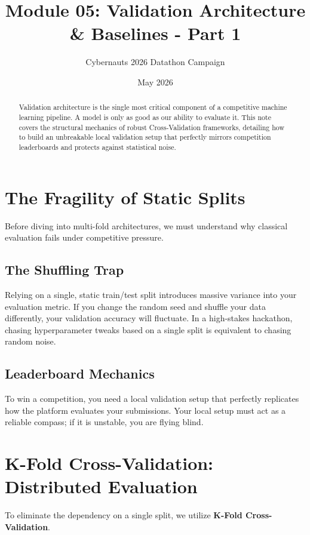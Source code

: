 \documentclass{article}
\title{Module 05: Validation Architecture \& Baselines - Part 1}
\author{Cybernauts 2026 Datathon Campaign}
\date{May 2026}
\begin{document}
\maketitle

\begin{abstract}
Validation architecture is the single most critical component of a competitive machine learning pipeline. A model is only as good as our ability to evaluate it. This note covers the structural mechanics of robust Cross-Validation frameworks, detailing how to build an unbreakable local validation setup that perfectly mirrors competition leaderboards and protects against statistical noise.
\end{abstract}

\tableofcontents
\newpage

\section{The Fragility of Static Splits}
Before diving into multi-fold architectures, we must understand why classical evaluation fails under competitive pressure.

\subsection{The Shuffling Trap}
Relying on a single, static train/test split introduces massive variance into your evaluation metric. If you change the random seed and shuffle your data differently, your validation accuracy will fluctuate. In a high-stakes hackathon, chasing hyperparameter tweaks based on a single split is equivalent to chasing random noise.

\subsection{Leaderboard Mechanics}
To win a competition, you need a local validation setup that perfectly replicates how the platform evaluates your submissions. Your local setup must act as a reliable compass; if it is unstable, you are flying blind.

\section{K-Fold Cross-Validation: Distributed Evaluation}
To eliminate the dependency on a single split, we utilize \textbf{K-Fold Cross-Validation}.
\end{document}
